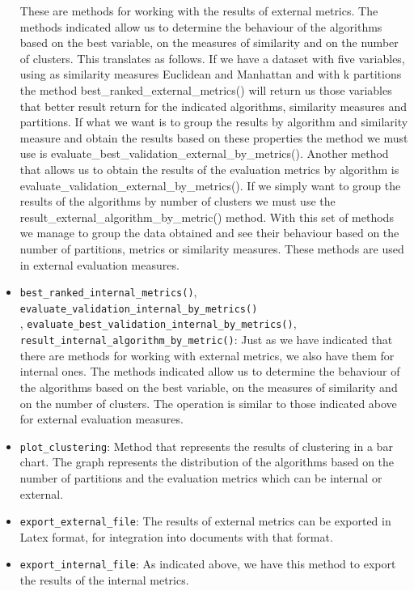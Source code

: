 \begin{itemize}
    These are methods for working with the results of external metrics. The methods indicated allow us to determine the behaviour of the algorithms based on the best variable, on the measures of similarity and on the number of clusters. This translates as follows. If we have a dataset with five variables, using as similarity measures Euclidean and Manhattan and with k partitions the method best\_ranked\_external\_metrics() will return us those variables that better result return for the indicated algorithms, similarity measures and partitions. If what we want is to group the results by algorithm and similarity measure and obtain the results based on these properties the method we must use is evaluate\_best\_validation\_external\_by\_metrics(). Another method that allows us to obtain the results of the evaluation metrics by algorithm is evaluate\_validation\_external\_by\_metrics(). If we simply want to group the results of the algorithms by number of clusters we must use the result\_external\_algorithm\_by\_metric() method. With this set of methods we manage to group the data obtained and see their behaviour based on the number of partitions, metrics or similarity measures. These methods are used in external evaluation measures.

    \item \texttt{best\_ranked\_internal\_metrics()}, \texttt{evaluate\_validation\_internal\_by\_metrics()}\\, \texttt{evaluate\_best\_validation\_internal\_by\_metrics()},\\ \texttt{result\_internal\_algorithm\_by\_metric()}: Just as we have indicated that there are methods for working with external metrics, we also have them for internal ones. The methods indicated allow us to determine the behaviour of the algorithms based on the best variable, on the measures of similarity and on the number of clusters. The operation is similar to those indicated above for external evaluation measures.
    \item \texttt{plot\_clustering}: Method that represents the results of clustering in a bar chart. The graph represents the distribution of the algorithms based on the number of partitions and the evaluation metrics which can be internal or external.
    \item \texttt{export\_external\_file}: The results of external metrics can be exported in Latex format, for integration into documents with that format.
    \item \texttt{export\_internal\_file}: As indicated above, we have this method to export the results of the internal metrics.
\end{itemize}

